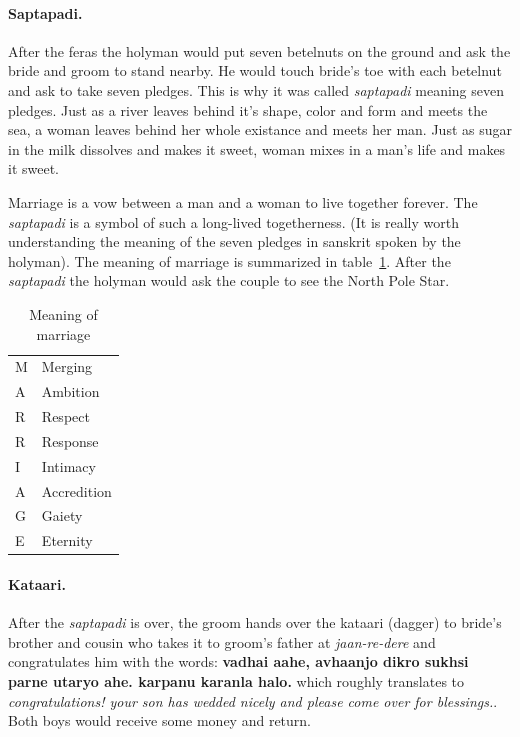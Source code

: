\paragraph{Saptapadi.} After the feras the holyman would put seven betelnuts on
the ground and ask the bride and groom to stand nearby. He would touch bride's
toe with each betelnut and ask to take seven pledges. This is why it was called
\textit{saptapadi} meaning seven pledges. Just as a river leaves behind it's shape,
color and form and meets the sea, a woman leaves behind her whole
existance and meets her man. Just as sugar in the milk dissolves and
makes it sweet, woman mixes in a man's life and makes it sweet.

Marriage is a vow between a man and a woman to live together forever. The
\textit{saptapadi} is a symbol of such a long-lived togetherness. (It is really
worth understanding the meaning of the seven pledges in sanskrit spoken
by the holyman). The meaning of marriage is summarized in
table~\ref{tbl:marriage}. After the \textit{saptapadi} the holyman would ask the couple to see the North Pole Star.

\begin{table}[h]
\begin{center}
\begin{tabular}{p{2.5cm}p{2.5cm}}
M & Merging \\
A & Ambition \\
R & Respect \\
R & Response \\
I & Intimacy \\
A & Accredition \\
G & Gaiety \\
E & Eternity \\
\end{tabular}
\end{center}
\caption{Meaning of marriage}
\label{tbl:marriage}
\end{table}

\paragraph{Kataari.} After the \textit{saptapadi} is over, the groom hands over
the kataari (dagger) to bride's brother and cousin who takes it to groom's
father at \textit{jaan-re-dere} and congratulates him with the words:
\textbf{vadhai aahe, avhaanjo dikro sukhsi parne utaryo ahe. karpanu karanla
halo.} which roughly translates to \textit{congratulations! your son has
wedded nicely and please come over for blessings.}. Both boys would
receive some money and return. 

